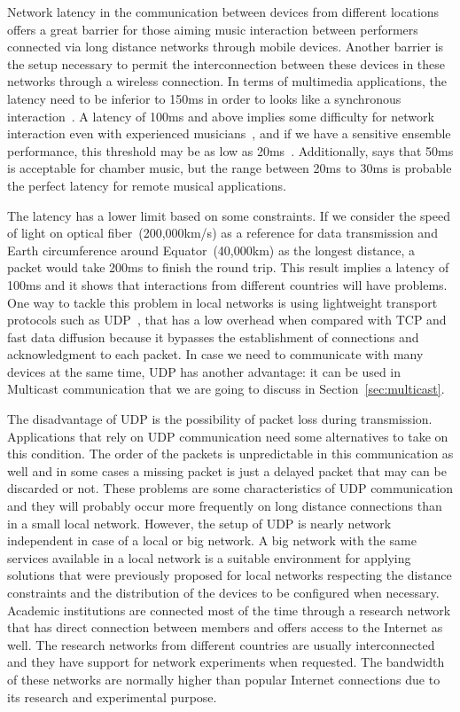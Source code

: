 Network latency in the communication between devices from different locations offers a great barrier for those aiming music interaction between performers connected via long distance networks through mobile devices.
Another barrier is the setup necessary to permit the interconnection between these devices in these networks through a wireless connection. 
In terms of multimedia applications, the latency need to be inferior to 150ms in order to looks like a synchronous interaction~\citep{Coulouris2011distributed}.
A latency of 100ms and above implies some difficulty for network interaction even with experienced musicians~\citep{Bartlette2006networkeffect}, and if we have a sensitive ensemble performance, this threshold may be as low as 20ms~\citep{Chafe2004network}.
Additionally, \cite{Lago2004thequest} says that 50ms is acceptable for chamber music, but the range between 20ms to 30ms is probable the perfect latency for remote musical applications. 

The latency has a lower limit based on some constraints.
If we consider the speed of light on optical fiber~(200,000km/s) as a reference for data transmission and Earth circumference around Equator~(40,000km) as the longest distance, a packet would take 200ms to finish the round trip.
This result implies a latency of 100ms and it shows that interactions from different countries will have problems.
One way to tackle this problem in local networks is using lightweight transport protocols such as UDP~\citep{Harker2008laptop,Caceres2010jacktrip}, that has a low overhead when compared with TCP and fast data diffusion because it bypasses the establishment of connections and acknowledgment to each packet.
In case we need to communicate with many devices at the same time, UDP has another advantage: it can be used in Multicast communication that we are going to discuss in Section~\ref{sec:multicast}.   

The disadvantage of UDP is the possibility of packet loss during transmission.
Applications that rely on UDP communication need some alternatives to take on this condition.
The order of the packets is unpredictable in this communication as well and in some cases a missing packet is just a delayed packet that may can be discarded or not.
These problems are some characteristics of UDP communication and they will probably occur more frequently on long distance connections than in a small local network.
However, the setup of UDP is nearly network independent in case of a local or big network.
A big network with the same services available in a local network is a suitable environment for applying solutions that were previously proposed for local networks respecting the distance constraints and the distribution of the devices to be configured when necessary.
Academic institutions are connected most of the time through a research network that has direct connection between members and offers access to the Internet as well.
The research networks from different countries are usually interconnected and they have support for network experiments when requested.
The bandwidth of these networks are normally higher than popular Internet connections due to its research and experimental purpose.

